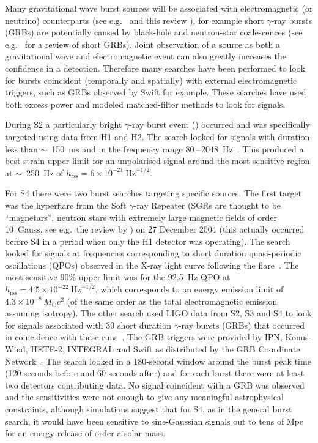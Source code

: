 Many gravitational wave burst sources will be associated with electromagnetic (or neutrino) counterparts 
(see e.g.\ \cite{2011CQGra..28k4013M} and this review \cite{2013CQGra..30s3002A}), for example short 
$\gamma$-ray bursts (GRBs) are potentially caused by black-hole and neutron-star coalescences (see e.g.\ 
\cite{2014ARA&A..52...43B} for a review of short GRBs). Joint observation of a source as both a gravitational 
wave and electromagnetic event can also greatly increases the confidence in a detection. Therefore many
searches have been performed to look for bursts coincident (temporally and spatially) with external 
electromagnetic triggers, such as GRBs observed by Swift for example. These searches have used both excess 
power and modeled matched-filter methods to look for signals.

During S2 a particularly bright $\gamma$-ray burst event () occurred and was 
specifically targeted using data from H1 and H2. The search looked for signals with duration less than 
$\sim$~150~ms and in the frequency range 80\,--\,2048~Hz~\cite{Abbott:2005d}. This produced a best strain 
upper limit for an unpolarised signal around the most sensitive region at  $\sim$~250~Hz of 
$h_{\mathrm{rss}}=6\times10^{-21} \mathrm{\ Hz}^{-1/2}$.

For S4 there were two burst searches targeting specific sources. The first target was the hyperflare from the 
Soft $\gamma$-ray Repeater \epubtkSIMBAD{SGR~1806--20} (SGRs are thought to be ``magnetars'', neutron stars 
with extremely large magnetic fields of order 10\super{15}~Gauss, see e.g.\ the review by 
\cite{Mereghetti2008}) on 27 December 2004 \cite{Hurley:2005} (this actually occurred before S4 in a period 
when only the H1 detector was operating). The search looked for signals at frequencies corresponding to short 
duration quasi-periodic oscillations (QPOs) observed in the X-ray light curve following the 
flare~\cite{Abbott:2007c}. The most sensitive 90\% upper limit was for the 92.5~Hz QPO at $h_{\mathrm{rss}} =
4.5\times10^{-22} \mathrm{\ Hz}^{-1/2}$, which corresponds to an energy emission limit
of $4.3\times10^{-8}\,M_{\odot}c^2$ (of the same order as the total electromagnetic emission assuming 
isotropy). The other search used LIGO data from S2, S3 and S4 to look for signals associated with 39 short 
duration $\gamma$-ray bursts (GRBs) that occurred in coincidence with these runs~\cite{Abbott:2008c}. The GRB 
triggers were provided by IPN, Konus-Wind, HETE-2, INTEGRAL and Swift as distributed by the GRB
Coordinate Network~\cite{GCN}. The search looked in a 180-second window around the burst peak time (120 
seconds before and 60 seconds after) and for each burst there were at least two detectors
contributing data. No signal coincident with a GRB was observed and the sensitivities were not enough to give 
any meaningful astrophysical constraints, although simulations suggest that for S4, as in the general burst
search, it would have been sensitive to sine-Gaussian signals out to tens of Mpc for an energy release of 
order a solar mass.

